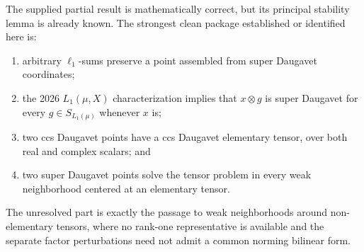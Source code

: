 \documentclass[11pt]{article}
\theoremstyle{definition}
\begin{document}
The supplied partial result is mathematically correct, but its principal
stability lemma is already known.  The strongest clean package established or
identified here is:
\begin{enumerate}[label=(\arabic*),leftmargin=2.2em]
\item arbitrary $\ell_1$-sums preserve a point assembled from super Daugavet
      coordinates;
\item the 2026 $L_1(\mu,X)$ characterization implies that $x\otimes g$ is
      super Daugavet for every $g\in S_{L_1(\mu)}$ whenever $x$ is;
\item two ccs Daugavet points have a ccs Daugavet elementary tensor, over both
      real and complex scalars; and
\item two super Daugavet points solve the tensor problem in every weak
      neighborhood centered at an elementary tensor.
\end{enumerate}
The unresolved part is exactly the passage to weak neighborhoods around
non-elementary tensors, where no rank-one representative is available and the
separate factor perturbations need not admit a common norming bilinear form.
\end{document}
